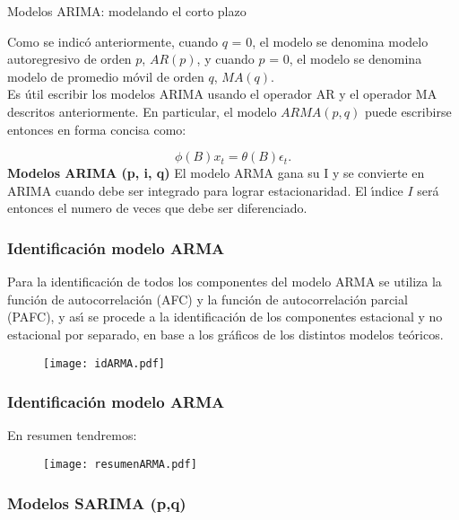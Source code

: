 \documentclass[spanish,xcolor=table]{beamer}
\begin{document}
\begin{section}{Modelos ARIMA: modelando el corto plazo}
\begin{frame}
Como se indic\'o anteriormente, cuando $q$ = 0, el modelo se denomina modelo autoregresivo de orden $p$, $AR (p)$, y cuando $p$ = 0, el modelo se denomina modelo de promedio m\'ovil de orden $q$, $MA (q)$. \\
Es \'util escribir los modelos ARIMA usando el operador AR y el operador MA descritos anteriormente. En particular, el modelo $ARMA (p, q) $ puede escribirse entonces en forma concisa como:

\begin{equation}
\phi (B) x_t = \theta (B) \epsilon_t.
\end{equation}
\textbf{Modelos ARIMA (p, i, q)}
El modelo ARMA gana su I y se convierte en ARIMA cuando debe ser integrado para lograr estacionaridad. El \'{\i}ndice $I$ ser\'a entonces el numero de veces que debe ser diferenciado.
\end{frame}

\begin{frame}
\frametitle{Identificaci\'on modelo ARMA }

Para la identificaci\'on de todos los componentes del modelo ARMA se utiliza la funci\'on de autocorrelaci\'on (AFC) y la funci\'on de autocorrelaci\'on parcial (PAFC), y as\'{\i} se procede a la identificaci\'on de los componentes estacional y no estacional por separado, en base a los gr\'aficos de los distintos modelos te\'oricos.

\begin{figure}[t!]
\texttt{[image: idARMA.pdf]}
\end{figure}

\end{frame}
\begin{frame}
\frametitle{Identificaci\'on modelo ARMA }

En resumen tendremos:

\begin{figure}[t!]
\texttt{[image: resumenARMA.pdf]}
\end{figure}

\end{frame}
\begin{frame}
\frametitle{Modelos SARIMA (p,q)}


\end{frame}
\end{section}
\end{document}
